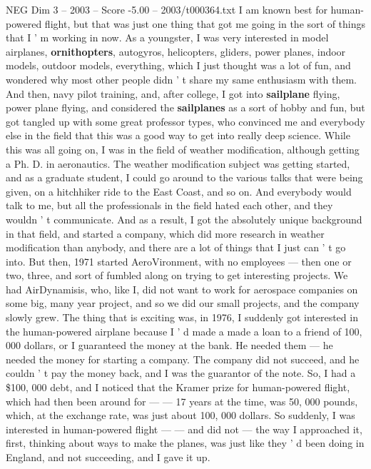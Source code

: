 \begin{textsample}{NEG Dim 3 – 2003 – Score -5.00 – 2003/t000364.txt}  \label{ex:f3_neg_010}
I am known best for human-powered flight, but that was just one thing that got me going in the sort of things that I ' m working in now.
As a youngster, I was very interested in model airplanes, \textbf{ornithopters}, autogyros, helicopters, gliders, power planes, indoor models, outdoor models, everything, which I just thought was a lot of fun, and wondered why most other people didn ' t share my same enthusiasm with them.
And then, navy pilot training, and, after college, I got into \textbf{sailplane} flying, power plane flying, and considered the \textbf{sailplanes} as a sort of hobby and fun, but got tangled up with some great professor types, who convinced me and everybody else in the field that this was a good way to get into really deep science.
While this was all going on, I was in the field of weather modification, although getting a Ph.
D. in aeronautics.
The weather modification subject was getting started, and as a graduate student, I could go around to the various talks that were being given, on a hitchhiker ride to the East Coast, and so on.
And everybody would talk to me, but all the professionals in the field hated each other, and they wouldn ' t communicate.
And as a result, I got the absolutely unique background in that field, and started a company, which did more research in weather modification than anybody, and there are a lot of things that I just can ' t go into.
But then, 1971 started AeroVironment, with no employees — then one or two, three, and sort of fumbled along on trying to get interesting projects.
We had AirDynamisis, who, like I, did not want to work for aerospace companies on some big, many year project, and so we did our small projects, and the company slowly grew.
The thing that is exciting was, in 1976, I suddenly got interested in the human-powered airplane because I ' d made a made a loan to a friend of 100, 000 dollars, or I guaranteed the money at the bank.
He needed them — he needed the money for starting a company.
The company did not succeed, and he couldn ' t pay the money back, and I was the guarantor of the note.
So, I had a \$100, 000 debt, and I noticed that the Kramer prize for human-powered flight, which had then been around for — — 17 years at the time, was 50, 000 pounds, which, at the exchange rate, was just about 100, 000 dollars.
So suddenly, I was interested in human-powered flight — — and did not — the way I approached it, first, thinking about ways to make the planes, was just like they ' d been doing in England, and not succeeding, and I gave it up.

\end{textsample}
